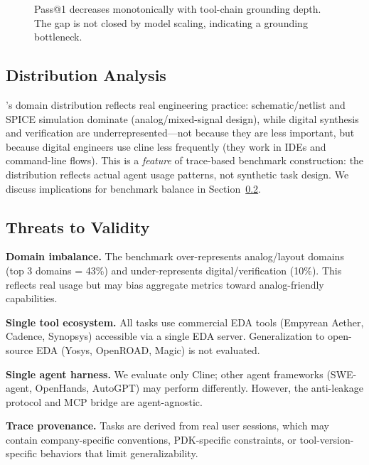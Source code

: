 \begin{figure}[ht]
\centering
\caption{Pass@1 decreases monotonically with tool-chain grounding depth. The gap is not closed by model scaling, indicating a grounding bottleneck.}
\label{fig:grounding-depth}
\end{figure}

\subsection{Distribution Analysis}
\label{sec:distribution}

\bench's domain distribution reflects real engineering practice: schematic/netlist and SPICE simulation dominate (analog/mixed-signal design), while digital synthesis and verification are underrepresented---not because they are less important, but because digital engineers use cline less frequently (they work in IDEs and command-line flows). This is a \emph{feature} of trace-based benchmark construction: the distribution reflects actual agent usage patterns, not synthetic task design. We discuss implications for benchmark balance in Section~\ref{sec:limitations}.

\subsection{Threats to Validity}
\label{sec:limitations}

\textbf{Domain imbalance.} The benchmark over-represents analog/layout domains (top 3 domains = 43\%) and under-represents digital/verification (10\%). This reflects real usage but may bias aggregate metrics toward analog-friendly capabilities.

\textbf{Single tool ecosystem.} All tasks use commercial EDA tools (Empyrean Aether, Cadence, Synopsys) accessible via a single EDA server. Generalization to open-source EDA (Yosys, OpenROAD, Magic) is not evaluated.

\textbf{Single agent harness.} We evaluate only Cline; other agent frameworks (SWE-agent, OpenHands, AutoGPT) may perform differently. However, the anti-leakage protocol and MCP bridge are agent-agnostic.

\textbf{Trace provenance.} Tasks are derived from real user sessions, which may contain company-specific conventions, PDK-specific constraints, or tool-version-specific behaviors that limit generalizability.
